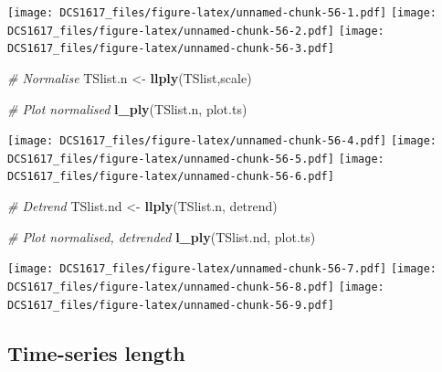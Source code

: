 \documentclass[]{book}
\newenvironment{Shaded}{\begin{snugshade}}{\end{snugshade}}
\newcommand{\KeywordTok}[1]{\textcolor[rgb]{0.13,0.29,0.53}{\textbf{{#1}}}}
\newcommand{\DataTypeTok}[1]{\textcolor[rgb]{0.13,0.29,0.53}{{#1}}}
\newcommand{\StringTok}[1]{\textcolor[rgb]{0.31,0.60,0.02}{{#1}}}
\newcommand{\CommentTok}[1]{\textcolor[rgb]{0.56,0.35,0.01}{\textit{{#1}}}}
\newcommand{\NormalTok}[1]{{#1}}
\begin{document}
\begin{Shaded}
\end{Shaded}

\texttt{[image: DCS1617\_files/figure-latex/unnamed-chunk-56-1.pdf]}
\texttt{[image: DCS1617\_files/figure-latex/unnamed-chunk-56-2.pdf]}
\texttt{[image: DCS1617\_files/figure-latex/unnamed-chunk-56-3.pdf]}

\begin{Shaded}
\begin{Highlighting}[]
\CommentTok{# Normalise}
\NormalTok{TSlist.n <-}\StringTok{ }\KeywordTok{llply}\NormalTok{(TSlist,scale)}

\CommentTok{# Plot normalised}
\KeywordTok{l_ply}\NormalTok{(TSlist.n, plot.ts)}
\end{Highlighting}
\end{Shaded}

\texttt{[image: DCS1617\_files/figure-latex/unnamed-chunk-56-4.pdf]}
\texttt{[image: DCS1617\_files/figure-latex/unnamed-chunk-56-5.pdf]}
\texttt{[image: DCS1617\_files/figure-latex/unnamed-chunk-56-6.pdf]}

\begin{Shaded}
\begin{Highlighting}[]
\CommentTok{# Detrend}
\NormalTok{TSlist.nd <-}\StringTok{ }\KeywordTok{llply}\NormalTok{(TSlist.n, detrend)}

\CommentTok{# Plot normalised, detrended}
\KeywordTok{l_ply}\NormalTok{(TSlist.nd, plot.ts)}
\end{Highlighting}
\end{Shaded}

\texttt{[image: DCS1617\_files/figure-latex/unnamed-chunk-56-7.pdf]}
\texttt{[image: DCS1617\_files/figure-latex/unnamed-chunk-56-8.pdf]}
\texttt{[image: DCS1617\_files/figure-latex/unnamed-chunk-56-9.pdf]}

\subsection{Time-series length}\label{time-series-length}
\end{document}
